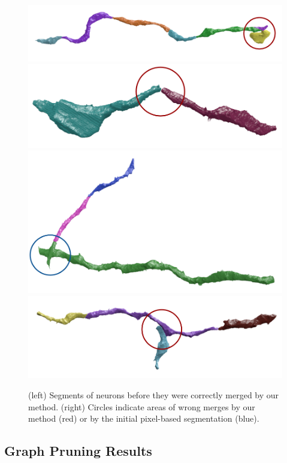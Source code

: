 \begin{figure}[t]
	\begin{minipage}{0.45\linewidth}
		\centering
		\includegraphics[width=0.85\linewidth]{./figures/VI-results/multicut-incorrect1.png}
		\includegraphics[width=0.85\linewidth]{./figures/VI-results/multicut-incorrect2.png}
		\includegraphics[width=0.85\linewidth]{./figures/VI-results/multicut-incorrect3.png}
		\includegraphics[width=0.85\linewidth]{./figures/VI-results/multicut-incorrect4.png}
	\end{minipage}
	\caption{(left) Segments of neurons before they were correctly merged by our method. (right) Circles indicate areas of wrong merges by our method (red) or by the initial pixel-based segmentation (blue).}
	\label{fig:qualitative-results}
\end{figure}

\subsection{Graph Pruning Results}

